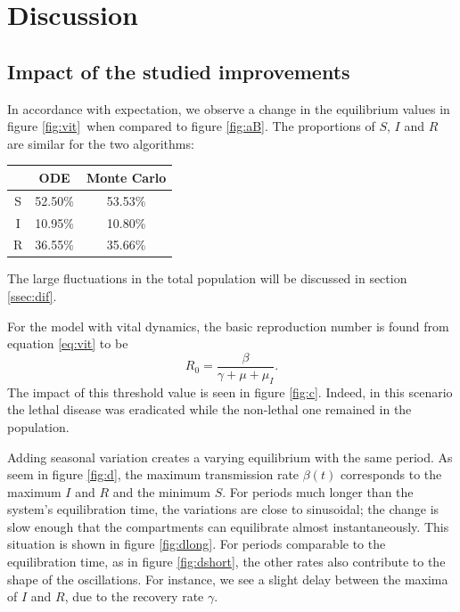 \documentclass[a4paper,10pt,twocolumn]{article}
\begin{document}
	 




%
%
%
\section{Discussion}






\subsection{Impact of the studied improvements}


In accordance with expectation, we observe a change in the equilibrium values in figure \ref{fig:vit} when compared to figure \ref{fig:aB}. The proportions of $S$, $I$ and $R$ are similar for the two algorithms:
\begin{center}
\begin{tabular}{ccc}\hline
& ODE & Monte Carlo	\\\hline
S & 52.50\% & 53.53\% \\
I & 10.95\% & 10.80\% \\
R & 36.55\% & 35.66\%  \\\hline
\end{tabular}
\end{center}
The large fluctuations in the total population will be discussed in section \ref{ssec:dif}. 

For the model with vital dynamics, the basic reproduction number is found from equation \ref{eq:vit} to be 
\[
R_0 = \frac{\beta}{\gamma + \mu + \mu_I}.
\]
The impact of this threshold value is seen  in figure \ref{fig:c}. Indeed, in this scenario the lethal disease was eradicated while the non-lethal one remained in the population. 


Adding seasonal variation creates a varying equilibrium with the same period. As seem in figure \ref{fig:d}, the maximum transmission rate $\beta(t)$ corresponds to the maximum $I$ and $R$ and the minimum $S$. 
For periods much longer than the system's equilibration time, the variations are close to sinusoidal; the change is slow enough that the compartments can equilibrate almost instantaneously. This situation is shown in figure \ref{fig:dlong}.
For periods comparable to the equilibration time, as in figure \ref{fig:dshort}, the other rates also contribute to the shape of the oscillations. For instance, we see a slight delay between the maxima of $I$ and $R$, due to the recovery rate $\gamma$. 
\end{document}
